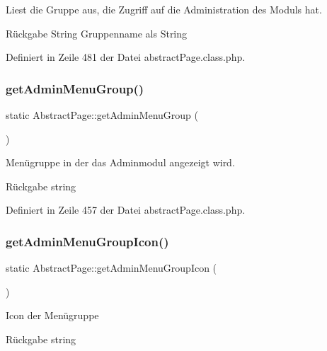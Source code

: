 Liest die Gruppe aus, die Zugriff auf die Administration des Moduls hat. \begin{DoxyReturn}{Rückgabe}
String Gruppenname als String 
\end{DoxyReturn}


Definiert in Zeile 481 der Datei abstract\+Page.\+class.\+php.

\mbox{\label{class_abstract_page_af8f1a5ff801475d561c4e20e89a80095}} 
\subsubsection{\texorpdfstring{get\+Admin\+Menu\+Group()}{getAdminMenuGroup()}}
{\footnotesize\ttfamily static Abstract\+Page\+::get\+Admin\+Menu\+Group (\begin{DoxyParamCaption}{ }\end{DoxyParamCaption})\hspace{0.3cm}{\ttfamily [static]}}

Menügruppe in der das Adminmodul angezeigt wird. \begin{DoxyReturn}{Rückgabe}
string 
\end{DoxyReturn}


Definiert in Zeile 457 der Datei abstract\+Page.\+class.\+php.

\mbox{\label{class_abstract_page_acab9ef8989c4f22e53805bf077e81463}} 
\subsubsection{\texorpdfstring{get\+Admin\+Menu\+Group\+Icon()}{getAdminMenuGroupIcon()}}
{\footnotesize\ttfamily static Abstract\+Page\+::get\+Admin\+Menu\+Group\+Icon (\begin{DoxyParamCaption}{ }\end{DoxyParamCaption})\hspace{0.3cm}{\ttfamily [static]}}

Icon der Menügruppe \begin{DoxyReturn}{Rückgabe}
string 
\end{DoxyReturn}


